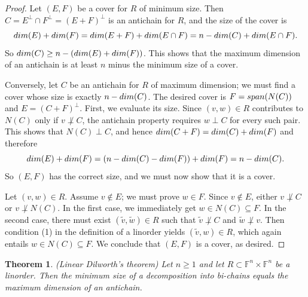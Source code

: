 \documentclass[10pt,a4paper]{amsart}
\newtheorem{thm}{Theorem}[section]
\begin{document}
\begin{proof}
Let $(E,F)$ be a cover for $R$ of minimum size. Then $C = E^\perp \cap F^\perp = (E + F)^\perp$ is an antichain for $R$, and the size of the cover is $${\rm dim}(E) + {\rm dim}(F) = {\rm dim}(E + F) + {\rm dim}(E \cap F) = n - {\rm dim}(C) + {\rm dim}(E \cap F).$$ So ${\rm dim}(C) \geq n - ({\rm dim}(E) + {\rm dim}(F))$. This shows that the maximum dimension of an antichain is at least $n$ minus the minimum size of a cover.

Conversely, let $C$ be an antichain for $R$ of maximum dimension; we must find a cover whose size is exactly $n - {\rm dim}(C)$. The desired cover is $F = {\rm span}(N(C))$ and $E = (C + F)^\perp$. First, we evaluate its size. Since $(v,w) \in R$ contributes to $N(C)$ only if $v \not\perp C$, the antichain property requires $w \perp C$ for every such pair. This shows that $N(C) \perp C$, and hence ${\rm dim}(C + F) = {\rm dim}(C) + {\rm dim}(F)$ and therefore $${\rm dim}(E) + {\rm dim}(F) = (n - {\rm dim}(C) - {\rm dim}(F)) + {\rm dim}(F) = n - {\rm dim}(C).$$ So $(E,F)$ has the correct size, and we must now show that it is a cover.

Let $(v,w) \in R$. Assume $v \not\in E$; we must prove $w \in F$. Since $v \not\in E$, either $v \not\perp C$ or $v \not\perp N(C)$. In the first case, we immediately get $w \in N(C) \subseteq F$. In the second case, there must exist $(\tilde{v},\tilde{w}) \in R$ such that $\tilde{v} \not\perp C$ and $\tilde{w} \not\perp v$. Then condition (1) in the definition of a linorder yields $(\tilde{v},w) \in R$, which again entails $w \in N(C) \subseteq F$. We conclude that $(E,F)$ is a cover, as desired.
\end{proof}

\begin{thm}\label{qdt} (Linear Dilworth's theorem)
Let $n \geq 1$ and let $R \subset \mathbb{F}^n \times \mathbb{F}^n$ be a linorder. Then the minimum size of a decomposition into bi-chains equals the maximum dimension of an antichain.
\end{thm}
\end{document}
